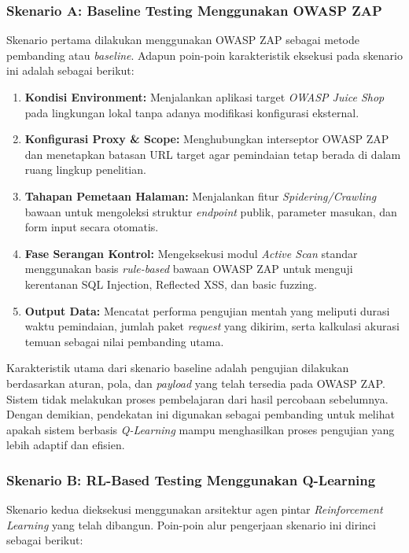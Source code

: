 \subsubsection{Skenario A: Baseline Testing Menggunakan OWASP ZAP}

Skenario pertama dilakukan menggunakan OWASP ZAP sebagai metode pembanding atau \textit{baseline}. Adapun poin-poin karakteristik eksekusi pada skenario ini adalah sebagai berikut:

\begin{enumerate}
    \item \textbf{Kondisi Environment:} Menjalankan aplikasi target \textit{OWASP Juice Shop} pada lingkungan lokal tanpa adanya modifikasi konfigurasi eksternal.
    \item \textbf{Konfigurasi Proxy \& Scope:} Menghubungkan interseptor OWASP ZAP dan menetapkan batasan URL target agar pemindaian tetap berada di dalam ruang lingkup penelitian.
    \item \textbf{Tahapan Pemetaan Halaman:} Menjalankan fitur \textit{Spidering/Crawling} bawaan untuk mengoleksi struktur \textit{endpoint} publik, parameter masukan, dan form input secara otomatis.
    \item \textbf{Fase Serangan Kontrol:} Mengeksekusi modul \textit{Active Scan} standar menggunakan basis \textit{rule-based} bawaan OWASP ZAP untuk menguji kerentanan SQL Injection, Reflected XSS, dan basic fuzzing.
    \item \textbf{Output Data:} Mencatat performa pengujian mentah yang meliputi durasi waktu pemindaian, jumlah paket \textit{request} yang dikirim, serta kalkulasi akurasi temuan sebagai nilai pembanding utama.
\end{enumerate}

Karakteristik utama dari skenario baseline adalah pengujian dilakukan berdasarkan aturan, pola, dan \textit{payload} yang telah tersedia pada OWASP ZAP. Sistem tidak melakukan proses pembelajaran dari hasil percobaan sebelumnya. Dengan demikian, pendekatan ini digunakan sebagai pembanding untuk melihat apakah sistem berbasis \textit{Q-Learning} mampu menghasilkan proses pengujian yang lebih adaptif dan efisien.

\subsubsection{Skenario B: RL-Based Testing Menggunakan Q-Learning}

Skenario kedua dieksekusi menggunakan arsitektur agen pintar \textit{Reinforcement Learning} yang telah dibangun. Poin-poin alur pengerjaan skenario ini dirinci sebagai berikut:

